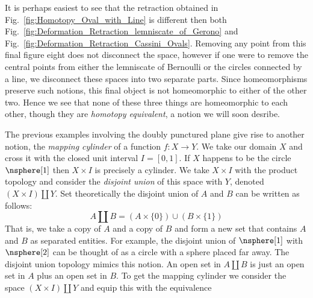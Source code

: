 \documentclass[oneside]{book}                                                  %
\begin{document}
                It is perhaps easiest to see that the retraction obtained in
                Fig.~\ref{fig:Homotopy_Oval_with_Line} is different then both
                Fig.~\ref{fig:Deformation_Retraction_lemniscate_of_Gerono} and
                Fig.~\ref{fig:Deformation_Retraction_Cassini_Ovals}. Removing
                any point from this final figure eight does not disconnect the
                space, however if one were to remove the central points from
                either the lemniscate of Bernoulli or the circles connected by a
                line, we disconnect these spaces into two separate parts. Since
                homeomorphisms preserve such notions, this final object is not
                homeomorphic to either of the other two. Hence we see that none
                of these three things are homeomorphic to each other, though
                they are \textit{homotopy equivalent}, a notion we will soon
                desribe.
                \par\hfill\par
                The previous examples involving the doubly punctured plane give
                rise to another notion, the \textit{mapping cylinder} of a
                function $f:X\rightarrow{Y}$. We take our domain $X$ and cross
                it with the closed unit interval $I=[0,1]$. If $X$ happens to be
                the circle $\nsphere[1]$ then $X\times{I}$ is precisely a
                cylinder. We take $X\times{I}$ with the product topology and
                consider the \textit{disjoint union} of this space with $Y$,
                denoted $(X\times{I})\coprod{Y}$. Set theoretically the
                disjoint union of $A$ and $B$ can be written as follows:
                \begin{equation}
                    \label{eqn:Def_Disjoint_Union}%
                    A\coprod{B}=(A\times\{0\})\cup(B\times\{1\})
                \end{equation}
                That is, we take a copy of $A$ and a copy of $B$ and form a
                new set that contains $A$ and $B$ as separated entities. For
                example, the disjoint union of $\nsphere[1]$ with $\nsphere[2]$
                can be thought of as a circle with a sphere placed far away. The
                disjoint union topology mimics this notion. An open set in
                $A\coprod{B}$ is just an open set in $A$ plus an open set in
                $B$. To get the mapping cylinder we consider the space
                $(X\times{I})\coprod{Y}$ and equip this with the equivalence
\end{document}
